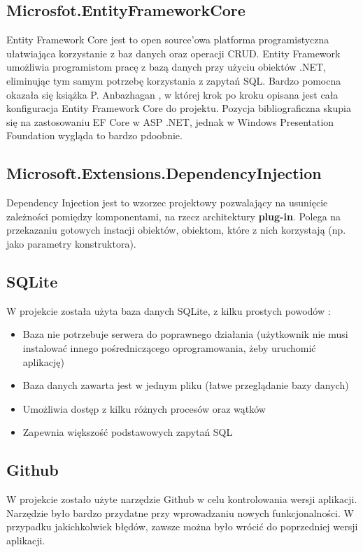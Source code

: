 \subsection{Microsfot.EntityFrameworkCore}
Entity Framework Core \cite{EFCore} jest to open source'owa platforma programistyczna ułatwiająca korzystanie z baz danych oraz operacji CRUD. Entity Framework umożliwia programistom pracę z bazą danych przy użyciu obiektów .NET, eliminując tym samym potrzebę korzystania z zapytań SQL. Bardzo pomocna okazała się książka P. Anbazhagan \cite{EFCoreBook}, w której krok po kroku opisana jest cała konfiguracja Entity Framework Core do projektu. Pozycja bibliograficzna skupia się na zastosowaniu EF Core w ASP .NET, jednak w Windows Presentation Foundation wygląda to bardzo pdoobnie.

\subsection{Microsoft.Extensions.DependencyInjection}
Dependency Injection jest to wzorzec projektowy pozwalający na usunięcie zależności pomiędzy komponentami, na rzecz architektury \textbf{plug-in}. Polega na przekazaniu gotowych instacji obiektów, obiektom, które z nich korzystają (np. jako parametry konstruktora).

\subsection{SQLite}
W projekcie została użyta baza danych SQLite, z kilku prostych powodów \cite{UsingSQLite}:
\begin{itemize}
    \item Baza nie potrzebuje serwera do poprawnego działania (użytkownik nie musi instalować innego pośredniczącego oprogramowania, żeby uruchomić aplikację)
    \item Baza danych zawarta jest w jednym pliku (łatwe przeglądanie bazy danych)
    \item Umożliwia dostęp z kilku różnych procesów oraz wątków
    \item Zapewnia większość podstawowych zapytań SQL
\end{itemize}

\subsection{Github}
W projekcie zostało użyte narzędzie Github \cite{GithubBook} w celu kontrolowania wersji aplikacji. Narzędzie było bardzo przydatne przy wprowadzaniu nowych funkcjonalności. W przypadku jakichkolwiek błędów, zawsze można było wrócić do poprzedniej wersji aplikacji.

